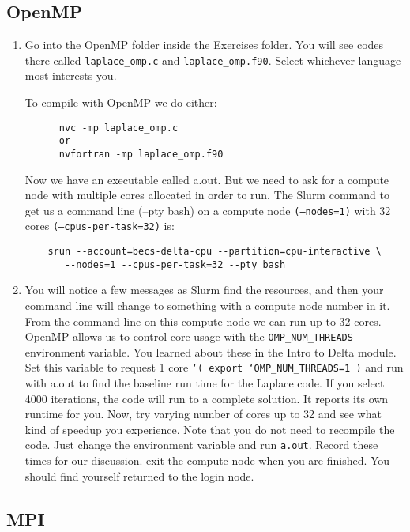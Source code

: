 \documentclass[11pt]{article}
\begin{document}
\subsection{OpenMP}

\begin{enumerate}
  \item{Go into the OpenMP folder inside the Exercises folder. You will see codes there called \texttt{laplace\_omp.c} and \texttt{laplace\_omp.f90}. Select whichever language most interests you.
  
  To compile with OpenMP we do either:
    \begin{verbatim}
      nvc -mp laplace_omp.c
      or
      nvfortran -mp laplace_omp.f90
    \end{verbatim}
    
  Now we have an executable called a.out. But we need to ask for a compute node with multiple cores allocated in order to run. The Slurm command to get us a command line (--pty bash) on a compute node \texttt{(--nodes=1)} with 32 cores \texttt{(--cpus-per-task=32)} is:
    \begin{verbatim}
    srun --account=becs-delta-cpu --partition=cpu-interactive \
       --nodes=1 --cpus-per-task=32 --pty bash

    \end{verbatim}
  }

  \item {You will notice a few messages as Slurm find the resources, and then your command line will change to something with a compute node number in it. From the command line on this compute node we can run up to 32 cores. OpenMP allows us to control core usage with the \texttt{OMP\_NUM\_THREADS} environment variable. You learned about these in the Intro to Delta module. Set this variable to request 1 core \texttt{`( export `OMP\_NUM\_THREADS=1 )} and run with a.out to find the baseline run time for the Laplace code. If you select 4000 iterations, the code will run to a complete solution. It reports its own runtime for you. Now, try varying number of cores up to 32 and see what kind of speedup you experience. Note that you do not need to recompile the code. Just change the environment variable and run \texttt{a.out}. Record these times for our discussion. exit the compute node when you are finished. You should find yourself returned to the login node. }
\end{enumerate}

\subsection{MPI} 
\end{document}
